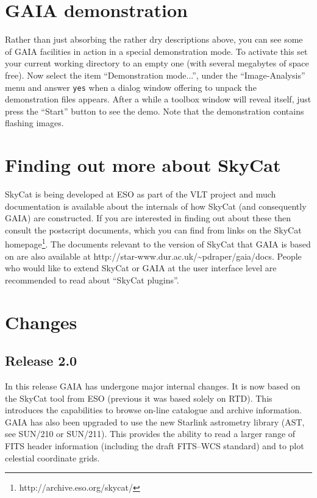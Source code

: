 \documentclass[twoside,11pt]{article}
\newcommand{\htmladdnormallinkfoot}[2]{#1\footnote{#2}}
\newcommand{\htmladdnormallink}[2]{#1}
\newcommand{\xref}[3]{#1}
\newcommand{\xlabel}[1]{}
\renewcommand{\_}{\texttt{\symbol{95}}}
\newcommand{\mytt}[1]{{\tt{#1}}}
\begin{document}
\section{\xlabel{gaia_demonstration}GAIA demonstration}
Rather than just absorbing the rather dry descriptions above, you can
see some of GAIA facilities in action in a special demonstration
mode. To activate this set your current working directory to an empty
one (with several megabytes of space free). Now select the item
``Demonstration mode...'', under the ``Image-Analysis'' menu and
answer \mytt{yes} when a dialog window offering to unpack the
demonstration files appears. After a while a toolbox window will
reveal itself, just press the ``Start'' button to see the demo. Note
that the demonstration contains flashing images.

\section{\xlabel{finding_out_more_about_skycat}Finding out more about SkyCat}
\htmladdnormallink{SkyCat}{http://archive.eso.org/skycat/} is being
developed at \htmladdnormallink{ESO}{http://www.eso.org/} as part of
the \htmladdnormallink{VLT}{http://www.eso.org/vlt/} project and much
documentation is available about the internals of how SkyCat (and
consequently GAIA) are constructed. If you are interested in finding
out about these then consult the postscript documents, which you can
find from links on the \htmladdnormallinkfoot{SkyCat
homepage}{http://archive.eso.org/skycat/}. The documents relevant to
the version of SkyCat that GAIA is based on are also available at
\htmladdnormallink{http://star-www.dur.ac.uk/\~{}pdraper/gaia/docs}
{http://star-www.dur.ac.uk/~pdraper/gaia/docs}. People who would like
to extend SkyCat or GAIA at the user interface level are recommended
to read about ``SkyCat plugins''.

\section{\xlabel{changes}Changes}
\subsection{Release 2.0}
In this release GAIA has undergone major internal changes. It is now
based on the SkyCat tool from ESO (previous it was based solely on
RTD). This introduces the capabilities to browse on-line catalogue and
archive information. GAIA has also been upgraded to use the new
Starlink astrometry library (AST, see \xref{SUN/210}{sun210}{} or
\xref{SUN/211}{sun211}{}). This provides the ability to read a larger
range of FITS header information (including the draft FITS--WCS
standard) and to plot celestial coordinate grids.
\end{document}

